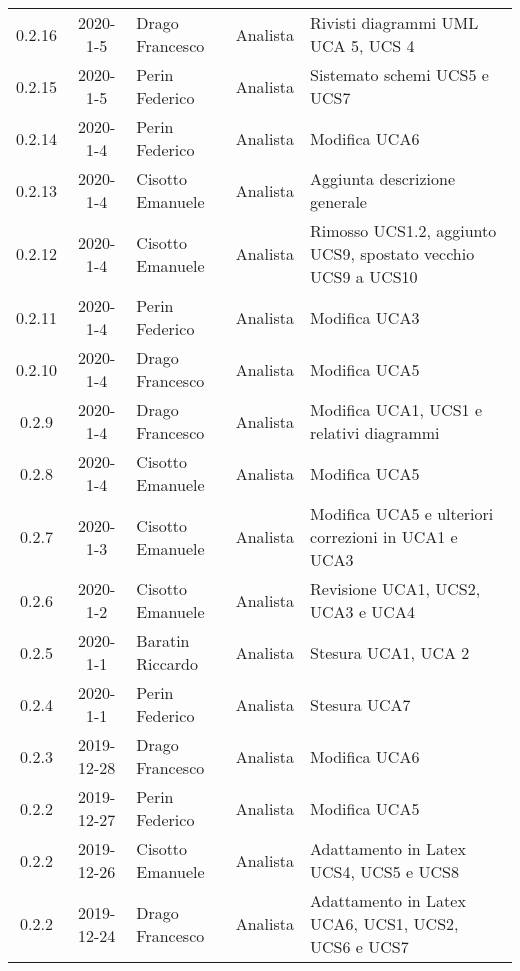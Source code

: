{\begin{longtable}{ c c  C{4cm}  C{3cm} C{4cm}}
0.2.16 & 2020-1-5 & Drago Francesco & Analista & Rivisti diagrammi UML UCA 5, UCS 4 \\

0.2.15 & 2020-1-5 & Perin Federico & Analista & Sistemato schemi UCS5 e UCS7 \\

0.2.14 & 2020-1-4 & Perin Federico & Analista & Modifica UCA6 \\

0.2.13 & 2020-1-4 & Cisotto Emanuele & Analista & Aggiunta descrizione generale \\

0.2.12 & 2020-1-4 & Cisotto Emanuele & Analista & Rimosso UCS1.2, aggiunto UCS9, spostato vecchio UCS9 a UCS10 \\

0.2.11 & 2020-1-4 & Perin Federico & Analista & Modifica UCA3 \\

0.2.10 & 2020-1-4 & Drago Francesco & Analista & Modifica UCA5 \\

0.2.9 & 2020-1-4 & Drago Francesco & Analista & Modifica UCA1, UCS1 e relativi diagrammi \\

0.2.8 & 2020-1-4 & Cisotto Emanuele & Analista & Modifica UCA5 \\

0.2.7 & 2020-1-3 & Cisotto Emanuele & Analista & Modifica UCA5 e ulteriori correzioni in UCA1 e UCA3 \\

0.2.6 & 2020-1-2 & Cisotto Emanuele & Analista & Revisione UCA1, UCS2, UCA3 e UCA4 \\

0.2.5 & 2020-1-1 & Baratin Riccardo & Analista & Stesura UCA1, UCA 2 \\

0.2.4 & 2020-1-1 & Perin Federico & Analista & Stesura UCA7 \\

0.2.3 & 2019-12-28 & Drago Francesco & Analista & Modifica UCA6 \\

0.2.2 & 2019-12-27 & Perin Federico & Analista & Modifica UCA5 \\

0.2.2 & 2019-12-26 & Cisotto Emanuele & Analista & Adattamento in Latex UCS4, UCS5 e UCS8 \\

0.2.2 & 2019-12-24 & Drago Francesco & Analista & Adattamento in Latex UCA6, UCS1, UCS2, UCS6 e UCS7 \\


\end{longtable}}
